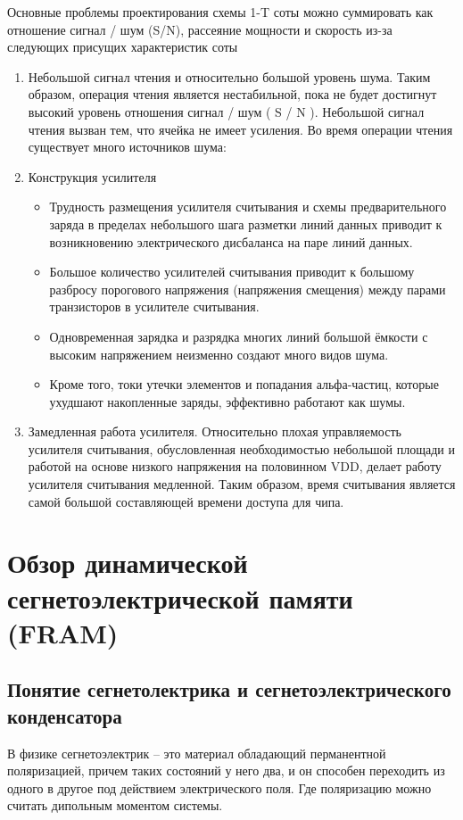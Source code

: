 \documentclass[a4paper,12pt]{article} %
\begin{document}
Основные проблемы проектирования схемы 1-T соты можно суммировать как отношение сигнал / шум (S/N), рассеяние мощности и скорость из-за следующих присущих характеристик соты \cite{DRAM-I}
\begin{enumerate}
	\item Небольшой сигнал чтения и относительно большой уровень шума. Таким образом, операция чтения является нестабильной, пока не будет достигнут высокий уровень отношения сигнал / шум ( S / N ). Небольшой сигнал чтения вызван тем, что ячейка не имеет усиления. Во время операции чтения существует много источников шума:
	
	\item Конструкция усилителя
	\begin{itemize}
	
	
		\item Трудность размещения усилителя считывания и схемы предварительного заряда в пределах небольшого шага разметки линий данных приводит к возникновению электрического дисбаланса на паре линий данных.
		\item Большое количество усилителей считывания приводит к большому разбросу порогового напряжения (напряжения смещения) между парами транзисторов в усилителе считывания.
		\item Одновременная зарядка и разрядка многих  линий большой ёмкости с высоким напряжением неизменно создают много видов шума.
		\item Кроме того, токи утечки элементов и попадания альфа-частиц, которые ухудшают накопленные заряды, эффективно работают как шумы.
	\end{itemize}
\item Замедленная работа усилителя. Относительно плохая управляемость усилителя считывания, обусловленная необходимостью небольшой площади и работой на основе низкого напряжения на половинном VDD, делает работу усилителя считывания медленной. Таким образом, время считывания является самой большой составляющей времени доступа для чипа.
\end{enumerate}






\section{Обзор динамической сегнетоэлектрической памяти (FRAM)}

\label{sec:fram}


\subsection{Понятие сегнетолектрика и сегнетоэлектрического конденсатора}
\label{subsec:ferro}
В физике сегнетоэлектрик -- это материал обладающий перманентной поляризацией, причем таких состояний у него два, и он способен переходить из одного в другое под действием  электрического поля. Где поляризацию можно считать дипольным моментом системы.
\end{document}
